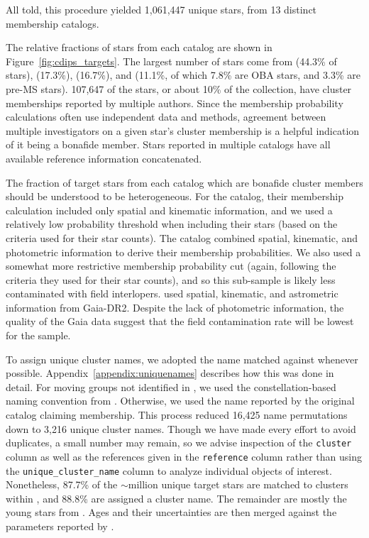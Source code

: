 \documentclass[12pt,twocolumn,tighten]{aastex62}
\begin{document}
All told, this procedure yielded 1{,}061{,}447 unique stars, from 13
distinct membership catalogs.

The relative fractions of stars from each catalog are shown in
Figure~\ref{fig:cdips_targets}.
The largest number of stars come from \citealt{dias_proper_2014}
(44.3\% of stars), \citealt{Kharchenko_et_al_2013} (17.3\%),
\citealt{cantat-gaudin_gaia_2018} (16.7\%), and \citealt{zari_3d_2018}
(11.1\%, of which 7.8\% are OBA stars, and 3.3\% are pre-MS stars).
107{,}647 of the stars, or about 10\%
of the collection, have cluster memberships reported by multiple
authors.  Since the membership probability calculations often use
independent data and methods, agreement between multiple investigators
on a given star's cluster membership is a helpful indication of it
being a bonafide member.
Stars reported in multiple catalogs have all available reference information
concatenated.  

The fraction of target stars from each catalog which are bonafide
cluster members should be understood to be heterogeneous.  For the
\citet{dias_proper_2014} catalog, their membership calculation
included only spatial and kinematic information, and we used a
relatively low probability threshold when including their stars (based
on the criteria \citealt{dias_proper_2014} used for their star
counts).  The \citet{Kharchenko_et_al_2013} catalog combined spatial,
kinematic, and photometric information to derive their membership
probabilities.  We also used a somewhat more restrictive membership
probability cut (again, following the criteria they used for their
star counts), and so this sub-sample is likely less contaminated
with field interlopers.
\citet{cantat-gaudin_gaia_2018} used spatial, kinematic, and
astrometric information from Gaia-DR2. Despite the lack of
photometric information, the quality of the Gaia data suggest that the
field contamination rate will be lowest for the
\citet{cantat-gaudin_gaia_2018} sample.


To assign unique cluster names, we adopted the name matched against
\citet{Kharchenko_et_al_2013} whenever possible.
Appendix~\ref{appendix:uniquenames} describes  how this was done in detail.
For moving groups not identified in \citet{Kharchenko_et_al_2013}, we used
the constellation-based naming convention from
\citet{gagne_banyan_XI_2018}.  Otherwise, we used the name reported by
the original catalog claiming membership.  This process reduced 16,425
name permutations down to 3,216 unique cluster names.  Though we have
made every effort to avoid duplicates, a small number may remain, so we
advise inspection of the \texttt{cluster} column
as well as the references given in the
\texttt{reference} column rather than using the
\texttt{unique\_cluster\_name} column to analyze individual objects
of interest.  Nonetheless, 87.7\% of the $\sim$million unique target
stars are matched to clusters within \citet{Kharchenko_et_al_2013},
and 88.8\% are assigned a cluster name.  The remainder are mostly the
young stars from \citet{zari_3d_2018}.
Ages and their uncertainties are then merged against the 
parameters reported by \citet{Kharchenko_et_al_2013}.
\end{document}
